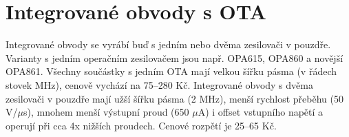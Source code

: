 \documentclass[twoside]{article}
\begin{document}
\section{Integrované obvody s OTA}
Integrované obvody se vyrábí buď s jedním nebo dvěma zesilovači v pouzdře. Varianty s jedním operačním zesilovačem jsou např. OPA615, OPA860 a novější OPA861. Všechny součástky s jedním OTA mají velkou šířku pásma (v řádech stovek MHz), cenově vychází na 75--280 Kč. Integrované obvody s dvěma zesilovači v pouzdře mají užší šířku pásma (2 MHz), menší rychlost přeběhu (50 V/$\mu$s), mnohem menší výstupní proud (650 $\mu$A) i offset vstupního napětí a operují při cca 4x nižších proudech. Cenové rozpětí je 25--65 Kč.
\renewcommand{\arraystretch}{1.5}
\begin{table}[H]
  \caption{\label{tab:Porovnání integrovaných obvodů s jedním OTA}orovnání integrovaných obvodů s jedním OTA \cite{5}}
  \end{table}
\end{document}
